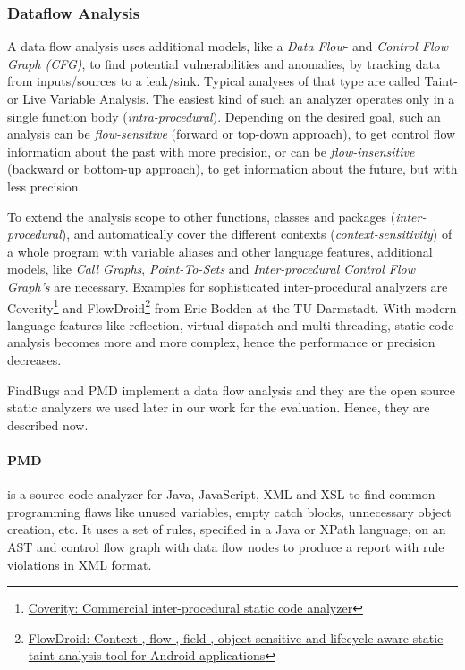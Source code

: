 \documentclass[conference]{IEEEtran}
\begin{document}
\subsubsection{Dataflow Analysis}
\label{subsubsec:dataflow_analysis}
A data flow analysis uses additional models, like a \textit{Data Flow}- and \textit{Control Flow Graph (CFG)}, to find potential vulnerabilities and anomalies, by tracking data from inputs/sources to a leak/sink.
Typical analyses of that type are called Taint- or Live Variable Analysis.
The easiest kind of such an analyzer operates only in a single function body (\textit{intra-procedural}).
Depending on the desired goal, such an analysis can be \textit{flow-sensitive} (forward or top-down approach), to get control flow information about the past with more precision, or can be \textit{flow-insensitive} (backward or bottom-up approach), to get information about the future, but with less precision.


To extend the analysis scope to other functions, classes and packages (\textit{inter-procedural}), and automatically cover the different contexts (\textit{context-sensitivity}) of a whole program with variable aliases and other language features, additional models, like \textit{Call Graphs}, \textit{Point-To-Sets} and \textit{Inter-procedural Control Flow Graph's} are necessary.
Examples for sophisticated inter-procedural analyzers are Coverity\footnote{\href{https://www.coverity.com}{Coverity: Commercial inter-procedural static code analyzer}} and FlowDroid\footnote{\href{http://sseblog.ec-spride.de/tools/flowdroid}{FlowDroid: Context-, flow-, field-, object-sensitive and lifecycle-aware static taint analysis tool for Android applications}} from Eric Bodden at the TU Darmstadt.
With modern language features like reflection, virtual dispatch and multi-threading, static code analysis becomes more and more complex, hence the performance or precision decreases.


FindBugs and PMD implement a data flow analysis and they are the open source static analyzers we used later in our work for the evaluation.
Hence, they are described now.

\paragraph{PMD}
is a source code analyzer for Java, JavaScript, XML and XSL to find common programming flaws like unused variables, empty catch blocks, unnecessary object creation, etc.
It uses a set of rules, specified in a Java or XPath language, on an AST and control flow graph with data flow nodes to produce a report with rule violations in XML format.
\end{document}
